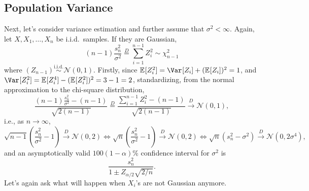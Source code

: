 \subsection{Population Variance}
Next, let's consider variance estimation and further assume that \(\sigma ^2 < \infty \). Again, let \(X, X_1, \dots , X_n\) be i.i.d.\ samples. If they are Gaussian,
\[
	(n-1) \frac{s_n^2}{\sigma ^2}
	\overset{D}{=} \sum_{i=1}^{n-1} Z_i^2
	\sim \chi ^2_{n-1}
\]
where \((Z_{n-1}) \overset{\text{i.i.d.} }{\sim } \mathcal{N} (0, 1)\). Firstly, since \(\mathbb{E}_{}[Z_i^2] = \Var_{}[Z_i] + (\mathbb{E}_{}[Z_i] )^2 = 1\), and \(\Var_{}[Z_i^2] = \mathbb{E}_{}[Z_i^4] - (\mathbb{E}_{}[Z_i^2] )^2 = 3 - 1 = 2\), standardizing, from the normal approximation to the chi-square distribution,
\[
	\frac{(n-1) \frac{s_n^2}{\sigma ^2} - (n - 1)}{\sqrt{2 (n-1)} }
	\overset{D}{=} \frac{\sum_{i=1}^{n-1} Z_i^2 - (n-1)}{\sqrt{2 (n-1)} }
	\overset{D}{\to } \mathcal{N} (0, 1),
\]
i.e., as \(n \to \infty \),
\[
	\sqrt{n-1} \left( \frac{s_n^2}{\sigma ^2} - 1 \right)  \overset{D}{\to } \mathcal{N} (0, 2)
	\iff \sqrt{n} \left( \frac{s_n^2}{\sigma ^2} - 1 \right)  \overset{D}{\to } \mathcal{N} (0, 2)
	\iff \sqrt{n} (s_n^2 - \sigma ^2) \overset{D}{\to } \mathcal{N} (0, 2 \sigma ^4),
\]
and an asymptotically valid \(100 (1 - \alpha )\%\) confidence interval for \(\sigma ^2\) is
\[
	\frac{s_n^2}{1 \pm Z_{\alpha / 2} \sqrt{2 / n} }.
\]
Let's again ask what will happen when \(X_i\)'s are not Gaussian anymore.

